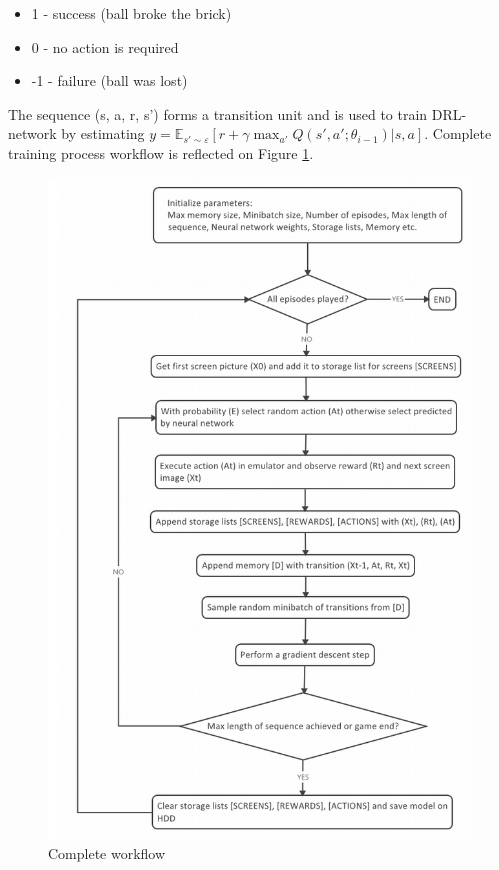 \documentclass[a4paper,oneside,dvipsnames]{article}
\begin{document}
\begin{itemize}[noitemsep]
	\item 1 - success (ball broke the brick)
	\item 0 - no action is required
	\item -1 - failure (ball was lost)
\end{itemize} 
The sequence (s, a, r, s') forms a transition unit and is used to train DRL-network by estimating $y = \mathbb{E}_{s'\sim \varepsilon}[r + \gamma \max_{a'} Q(s', a';\theta_{i-1})|s,a]$. Complete training process workflow is reflected on Figure \ref{fig:a_workflow}.
\begin{figure}[H]
    \centering
    \includegraphics[scale=0.40]{alorithm.png}
    \caption{Complete workflow}
    \label{fig:a_workflow}
\end{figure}
\end{document}
